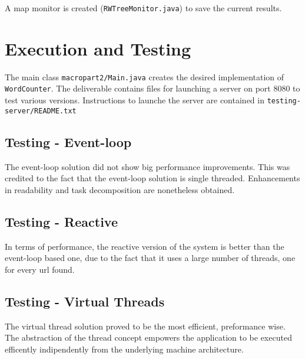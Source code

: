 \documentclass[12pt, a4paper]{report}
\begin{document}
A map monitor is created (\texttt{RWTreeMonitor.java}) to save the current results.

\section{Execution and Testing}
The main class \texttt{macropart2/Main.java} creates the desired implementation of \texttt{WordCounter}.
The deliverable contains files for launching a server on port 8080 to test various versions. Instructions to launche the server are contained in
 \texttt{testing-server/README.txt}

\subsection{Testing - Event-loop}
The event-loop solution did not show big performance improvements. This was credited to the fact that the event-loop solution is single threaded.
 Enhancements in readability and task decomposition are nonetheless obtained.

\subsection{Testing - Reactive}
In terms of performance, the reactive version of the system is better than the event-loop based one, due to the fact that it uses a large number of threads, one for every url found.

\subsection{Testing - Virtual Threads}
The virtual thread solution proved to be the most efficient, preformance wise. The abstraction of the thread concept empowers the application to be executed
 efficently indipendently from the underlying machine architecture.


\end{document}
